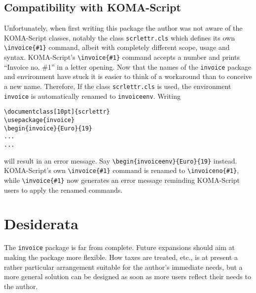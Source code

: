 \documentclass[11pt]{ltxdoc}
\begin{document}
\subsection{\label{koma}Compatibility with KOMA-Script}

Unfortunately, when first writing this package the author was not aware
of the KOMA-Script classes, notably the class \texttt{scrlettr.cls}
which defines its own \verb-\invoice{#1}- command, albeit with completely
different scope, usage and syntax. KOMA-Script's \verb-\invoice{#1}- command
accepts a number and prints ``Invoice no. \#1'' in a letter 
opening. Now that the names of the \texttt{invoice} package and
environment have stuck it is easier to think of a workaround than to
conceive a new name. Therefore, If the class \texttt{scrlettr.cls} is
used, the environment \texttt{invoice} is automatically renamed to
\texttt{invoiceenv}. Writing 

\begin{verbatim}
\documentclass[10pt]{scrlettr}
\usepackage{invoice}
\begin{invoice}{Euro}{19}
...
...
\end{verbatim}

will result in an error message. Say \verb-\begin{invoiceenv}{Euro}{19}-
instead.  KOMA-Script's own \verb-\invoice{#1}- command is renamed to
\verb-\invoiceno{#1}-, while \verb-\invoice{#1}- now generates an 
error message reminding KOMA-Script users to apply the renamed
commands.

\section{Desiderata}

The \verb-invoice- package is far from complete. Future expansions
should aim at making the package more flexible. How taxes are
treated, etc., is at present a rather particular arrangement
suitable for the author's immediate needs, but a more general
solution can be designed as soon as more users reflect their needs
to the author.
\end{document}
